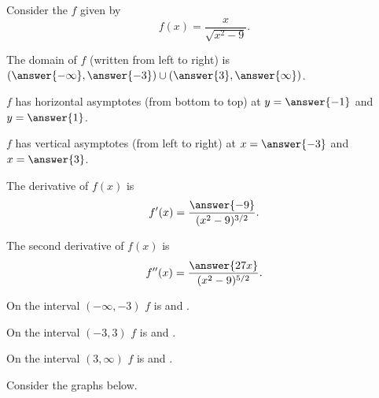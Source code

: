 \documentclass{ximera}
\author{Nela Lakos \and Kyle Parsons}
\begin{document}
\begin{exercise}

Consider the $f$ given by
\[
f(x) = \frac{x}{\sqrt{x^2-9}}.
\]

The domain of $f$ (written from left to right) is $\left(\answer{-\infty},\answer{-3}\right)\cup\left(\answer{3},\answer{\infty}\right)$.

$f$ has horizontal asymptotes (from bottom to top) at $y=\answer{-1}$ and $y=\answer{1}$.

$f$ has vertical asymptotes (from left to right) at $x=\answer{-3}$ and $x=\answer{3}$.

The derivative of $f(x)$ is
\[
f'(x) =\frac{ \answer{-9}}{(x^2-9)^{3/2}}.
\]

The second derivative of $f(x)$ is
\[
f''(x) =\frac{\answer{27x}}{(x^2-9)^{5/2}}.
\]

On the interval $(-\infty,-3)$ $f$ is  and .

On the interval $(-3,3)$ $f$ is  and .

On the interval $(3,\infty)$ $f$ is  and .

Consider the graphs below.



\end{exercise}
\end{document}
